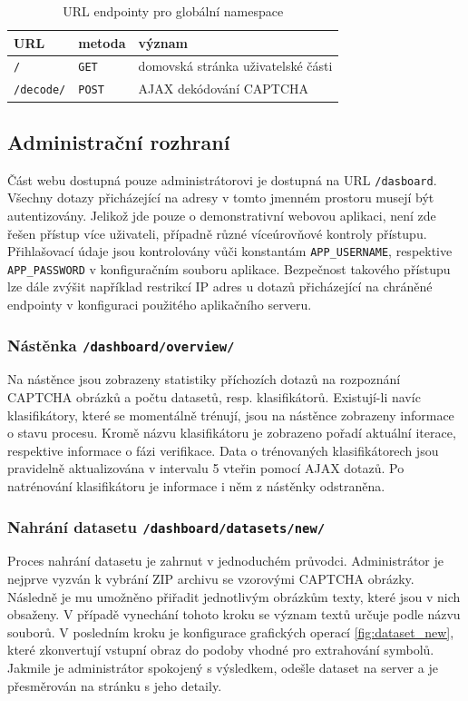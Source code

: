 \documentclass[
  field=ainfp,
  master=true,
  biblatex,
  sourcecodes=false,
  theorems=false,
  glossaries,
  index
]{kidiplom}
\begin{document}
\begin{table}[H]
\centering
\begin{tabular}{|l|l|l|}
\hline
\textbf{URL} & \textbf{metoda} & \textbf{význam}
\\ \hline
\texttt{/} & \texttt{GET} & domovská stránka uživatelské části
\\ \hline
\texttt{/decode/} & \texttt{POST} & AJAX dekódování CAPTCHA
\\ \hline
\end{tabular}
\caption{URL endpointy pro globální namespace}
\end{table}

\subsection{Administrační rozhraní}
Část webu dostupná pouze administrátorovi je dostupná na URL \texttt{/dasboard}. Všechny dotazy přicházející na adresy v tomto jmenném prostoru musejí být autentizovány. Jelikož jde pouze o demonstrativní webovou aplikaci, není zde řešen přístup více uživateli, případně různé víceúrovňové kontroly přístupu. Přihlašovací údaje jsou kontrolovány vůči konstantám \texttt{APP\_USERNAME}, respektive \texttt{APP\_PASSWORD} v konfiguračním souboru aplikace. Bezpečnost takového přístupu lze dále zvýšit například restrikcí IP adres u dotazů přicházející na chráněné endpointy v konfiguraci použitého aplikačního serveru.

\subsubsection*{Nástěnka \texttt{/dashboard/overview/}}
 Na nástěnce jsou zobrazeny statistiky příchozích dotazů na rozpoznání CAPT\-CHA obrázků a počtu datasetů, resp. klasifikátorů. Existují-li navíc klasifikátory, které se momentálně trénují, jsou na nástěnce zobrazeny informace o stavu procesu. Kromě názvu klasifikátoru je zobrazeno pořadí aktuální iterace, respektive informace o fázi verifikace. Data o trénovaných klasifikátorech jsou pravidelně aktualizována v intervalu 5 vteřin pomocí AJAX dotazů. Po natrénování klasifikátoru je informace i něm z nástěnky odstraněna.

\subsubsection*{Nahrání datasetu \texttt{/dashboard/datasets/new/}}
Proces nahrání datasetu je zahrnut v jednoduchém průvodci. Administrátor je nejprve vyzván k vybrání ZIP archivu se vzorovými CAPTCHA obrázky. Následně je mu umožněno přiřadit jednotlivým obrázkům texty, které jsou v nich obsaženy. V případě vynechání tohoto kroku se význam textů určuje podle názvu souborů. V posledním kroku je konfigurace grafických operací \ref{fig:dataset_new}, které zkonvertují vstupní obraz do podoby vhodné pro extrahování symbolů. Jakmile je administrátor spokojený s výsledkem, odešle dataset na server a je přesměrován na stránku s jeho detaily.
\end{document}
